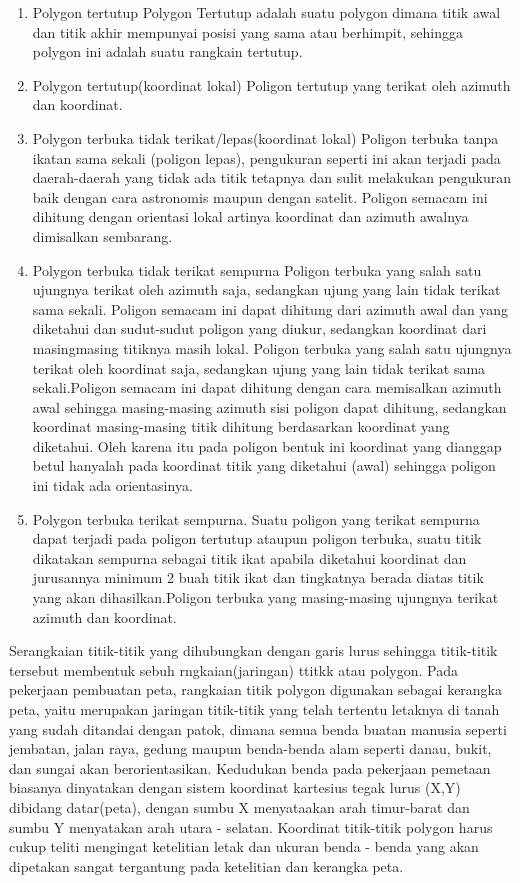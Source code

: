 \begin{enumerate}
\item Polygon tertutup
  Polygon Tertutup adalah suatu polygon dimana titik awal dan titik akhir mempunyai posisi yang sama atau berhimpit, sehingga polygon ini adalah suatu rangkain tertutup.
\item Polygon tertutup(koordinat lokal)
  Poligon tertutup yang terikat oleh azimuth dan koordinat.
\item Polygon terbuka tidak terikat/lepas(koordinat lokal)
  Poligon terbuka tanpa ikatan sama sekali (poligon lepas), pengukuran seperti ini akan terjadi pada daerah-daerah yang tidak ada titik tetapnya dan sulit melakukan pengukuran baik dengan cara astronomis maupun dengan satelit. Poligon semacam ini dihitung dengan orientasi lokal artinya koordinat dan azimuth awalnya dimisalkan sembarang.
\item Polygon terbuka tidak terikat sempurna
  Poligon terbuka yang salah satu ujungnya terikat oleh azimuth saja, sedangkan ujung yang lain tidak terikat sama sekali. Poligon semacam ini dapat dihitung dari azimuth awal dan yang diketahui dan sudut-sudut poligon yang diukur, sedangkan koordinat dari masingmasing titiknya masih lokal. Poligon terbuka yang salah satu ujungnya terikat oleh koordinat saja, sedangkan ujung yang lain tidak terikat sama sekali.Poligon semacam ini dapat dihitung dengan cara memisalkan azimuth awal sehingga masing-masing azimuth sisi poligon dapat dihitung, sedangkan koordinat masing-masing titik dihitung berdasarkan koordinat yang diketahui. Oleh karena itu pada poligon bentuk ini koordinat yang dianggap betul hanyalah pada koordinat titik yang diketahui (awal) sehingga poligon ini tidak ada orientasinya.
\item Polygon terbuka terikat sempurna.
  Suatu poligon yang terikat sempurna dapat terjadi pada poligon tertutup ataupun poligon terbuka, suatu titik dikatakan sempurna sebagai titik ikat apabila diketahui koordinat dan jurusannya minimum 2 buah titik ikat dan tingkatnya berada diatas titik yang akan dihasilkan.Poligon terbuka yang masing-masing ujungnya terikat azimuth dan koordinat.
\end{enumerate}

Serangkaian titik-titik yang dihubungkan dengan garis lurus sehingga titik-titik tersebut membentuk sebuh rngkaian(jaringan) ttitkk atau polygon. Pada pekerjaan pembuatan peta, rangkaian titik polygon digunakan sebagai  kerangka peta, yaitu merupakan jaringan titik-titik yang telah tertentu letaknya di tanah yang sudah ditandai dengan patok, dimana semua benda buatan manusia seperti jembatan, jalan raya, gedung maupun benda-benda alam seperti danau, bukit, dan sungai akan berorientasikan. Kedudukan benda pada pekerjaan pemetaan biasanya dinyatakan dengan sistem koordinat  kartesius tegak lurus (X,Y) dibidang datar(peta), dengan sumbu X menyataakan arah timur-barat dan sumbu Y menyatakan arah utara - selatan. Koordinat titik-titik polygon harus cukup teliti mengingat ketelitian letak dan ukuran benda - benda yang akan dipetakan sangat tergantung pada ketelitian dan kerangka peta.

